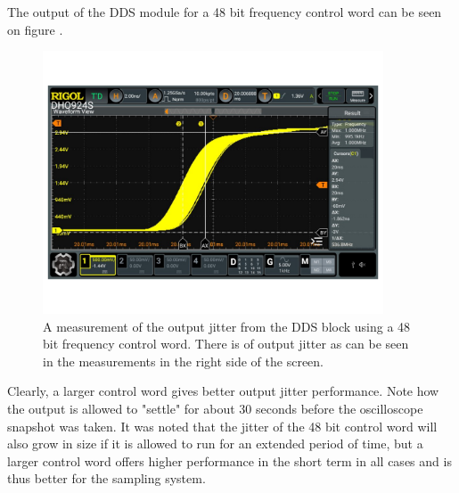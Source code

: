 The output of the DDS module for a 48 bit frequency control word can be seen on figure .
\begin{figure}[H]
    \centering
    \includegraphics[clip, trim=0 50 0 0, width=0.9\textwidth]{Appendix/Figures/A_DDS_JITTER_48BIT.pdf}
    \caption{A measurement of the output jitter from the DDS block using a 48 bit frequency control word. There is  of output jitter as can be seen in the measurements in the right side of the screen.}
    \label{fig:A_DDS_JITTER_48BIT}
\end{figure}

Clearly, a larger control word gives better output jitter performance. Note how the output is allowed to "settle" for about 30 seconds before the oscilloscope snapshot was taken. It was noted that the jitter of the 48 bit control word will also grow in size if it is allowed to run for an extended period of time, but a larger control word offers higher performance in the short term in all cases and is thus better for the sampling system.